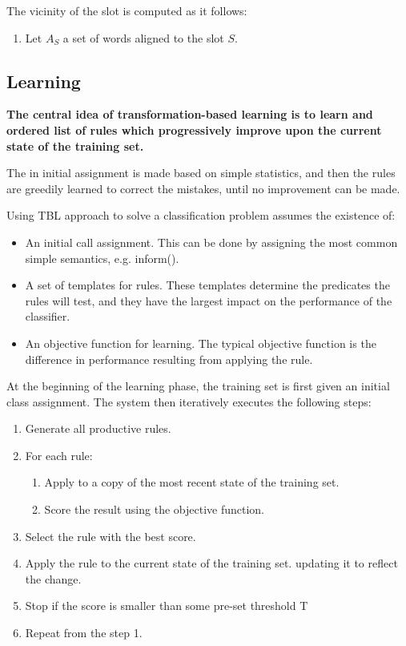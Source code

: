 \documentclass[11pt]{article}
\begin{document}
The vicinity of the slot is computed as it follows:

\begin{enumerate}
  \item Let $A_S$ a set of words aligned to the slot $S$.
\end{enumerate}


\subsection{Learning} \label{sec:tbl:learning}
\textbf{The central idea of transformation-based learning is to learn and ordered list of rules which progressively improve upon the current state of the training set.} 

The in initial assignment is made based on simple statistics, and then the rules are greedily learned to correct the mistakes, until no improvement can be made.

Using TBL approach to solve a classification problem assumes the existence of:


\begin{itemize}
  \item An initial call assignment. This can be done by assigning the most common simple semantics, e.g. inform().
  \item A set of templates for rules. These templates determine the predicates the rules will test, and they have the largest impact on the performance of the classifier.
  \item An objective function for learning. The typical objective function is the difference in performance resulting from applying the rule.
\end{itemize}

At the beginning of the learning phase, the training set is first given an initial class assignment. The system then iteratively executes the following steps:

\begin{enumerate}
  \item Generate all productive rules.
  \item For each rule:
  \begin{enumerate}
    \item Apply to a copy of the most recent state of the training set.
    \item Score the result using the objective function.
  \end{enumerate}
  \item Select the rule with the best score.
  \item Apply the rule  to the current state of the training set. updating it to reflect the change.
  \item Stop if the score is smaller than some pre-set threshold T
  \item Repeat from the step 1.
\end{enumerate}
\end{document}
